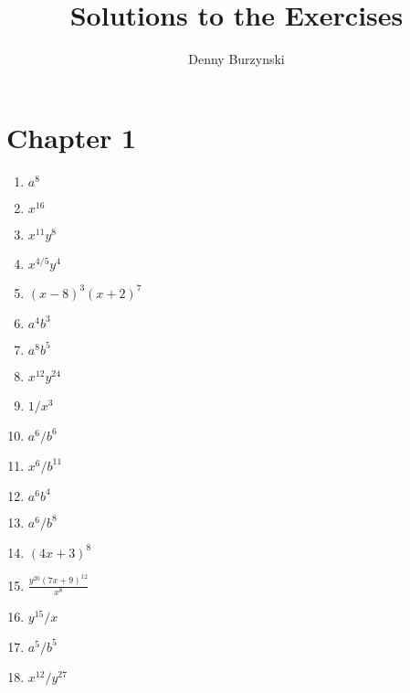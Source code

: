 \documentclass[a4paper]{JAC2003}
\begin{document}
\title{Solutions to the Exercises}

\author{Denny Burzynski}

\date{}

\maketitle

\clearpage
\setlength{\columnseprule}{0.2pt}
\section{Chapter 1}



\begin{enumerate}
\item  $a^{8}$

\item  $x^{16}$

\item $x^{11} y^{8}$

\item  $x^{4 / 5} y^{4}$

\item  $(x-8)^{3}(x+2)^{7}$

\item  $a^{4} b^{3}$

\item  $a^{8} b^{5}$

\item  $x^{12} y^{24}$

\item  $1 / x^{3}$

\item  $a^{6} / b^{6}$

\item  $x^{6} / b^{11}$

\item  $a^{6} b^{4}$

\item  $a^{6} / b^{8}$

\item  $(4 x+3)^{8}$

\item  $\frac{y^{20}(7 x+9)^{12}}{x^{8}}$

\item  $y^{15} / x$

\item  $a^{5} / b^{5}$

\item  $x^{12} / y^{27}$


\end{enumerate}
\end{document}
